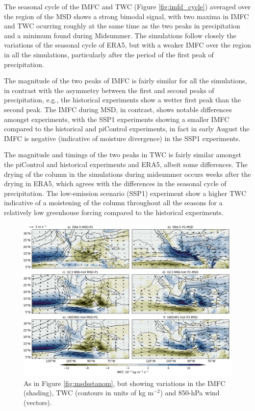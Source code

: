 The seasonal cycle of the IMFC and TWC (Figure \ref{fig:imfd_cycle}) averaged over the region of the MSD shows a strong bimodal signal, with two maxima in IMFC and TWC ocurring roughly at the same time as the two peaks in precipitation and a minimum found during Midsummer. The simulations follow closely the variations of the seasonal cycle of ERA5, but with a weaker IMFC over the region in all the simulations, particularly after the period of the first peak of precipitation. 

The magnitude of the two peaks of IMFC is fairly similar for all the simulations, in contrast with the asymmetry between the first and second peaks of precipitation, e.g., the historical experiments show a wetter first peak than the second peak. The IMFC during MSD, in contrast, shows notable differences amongst experiments, with the SSP1 experiments showing a smaller IMFC compared to the historical and piControl experiments, in fact in early August the IMFC is negative (indicative of moisture divergence) in the SSP1 experiments.

 The magnitude and timings of the two peaks in  TWC is fairly similar amongst the piControl and historical experiments and ERA5, albeit some differences. The drying of the column in the simulations during midsummer occurs weeks after the drying in ERA5, which agrees with the differences in the seasonal cycle of precipitation. The low-emission scenario (SSP1) experiment show a higher TWC indicative of a moistening of the column throughout all the seasons for a relatively low greenhouse forcing compared to the historical experiments. %

\begin{figure}[t!]
\includegraphics[width=\linewidth]{figures/imfdcomposite.png}
\caption[Composites of IMFC, TWC and CLLJ]{As in Figure \ref{fig:msdsstanom}, but showing variations in the IMFC (shading), TWC (contours in units of kg m$^{-2}$) and 850-hPa wind (vectors). }
\label{fig:msdmfcanom}
\end{figure}

